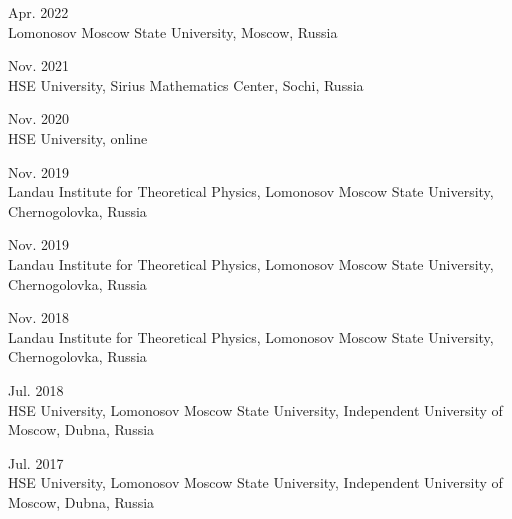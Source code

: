 \documentclass[11pt,letterpaper]{report}
\begin{document}
\begin{tablist}
      \item{Apr. 2022} \\ Lomonosov Moscow State University, Moscow, Russia
      
      \item{Nov. 2021} \\ HSE University, Sirius Mathematics Center, Sochi, Russia  
      
       \item{Nov. 2020} \\ HSE University, online
       
       \item{Nov. 2019} \\ Landau Institute for Theoretical Physics, Lomonosov Moscow State University, Chernogolovka, Russia
       
       \item{Nov. 2019} \\ Landau Institute for Theoretical Physics, Lomonosov Moscow State University, Chernogolovka, Russia
       
        \item{Nov. 2018} \\ Landau Institute for Theoretical Physics, Lomonosov Moscow State University, Chernogolovka, Russia
       
       \item{Jul. 2018} \\ HSE University, Lomonosov Moscow State University, Independent University of Moscow, Dubna, Russia
       
        \item{Jul. 2017} \\ HSE University, Lomonosov Moscow State University, Independent University of Moscow, Dubna, Russia
        
            
    \end{tablist}

    
    
    
    
\end{document}

